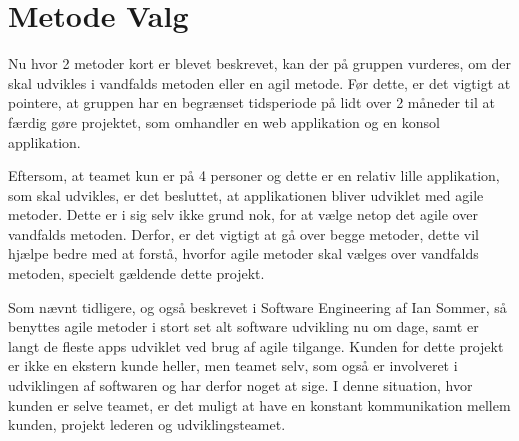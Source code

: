 \section{Metode Valg}

Nu hvor 2 metoder kort er blevet beskrevet, kan der på gruppen vurderes, om der skal udvikles i vandfalds metoden eller en agil metode. Før dette, er det vigtigt at pointere, at gruppen har en begrænset tidsperiode på lidt over 2 måneder til at færdig gøre projektet, som omhandler en web applikation og en konsol applikation. 

Eftersom, at teamet kun er på 4 personer og dette er en relativ lille applikation, som skal udvikles, er det besluttet, at applikationen bliver udviklet med agile metoder. Dette er i sig selv ikke grund nok, for at vælge netop det agile over vandfalds metoden. Derfor, er det vigtigt at gå over begge metoder, dette vil hjælpe bedre med at forstå, hvorfor agile metoder skal vælges over vandfalds metoden, specielt gældende dette projekt. 

Som nævnt tidligere, og også beskrevet i Software Engineering af Ian Sommer, så benyttes agile metoder i stort set alt software udvikling nu om dage, samt er langt de fleste apps udviklet ved brug af agile tilgange. \cite{Sommerville} Kunden for dette projekt er ikke en ekstern kunde heller, men teamet selv, som også er involveret i udviklingen af softwaren og har derfor noget at sige. I denne situation, hvor kunden er selve teamet, er det muligt at have en konstant kommunikation mellem kunden, projekt lederen og udviklingsteamet. 


